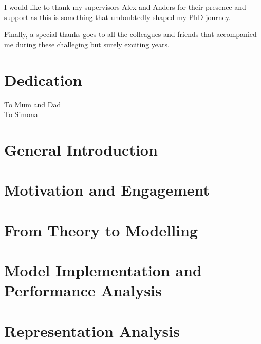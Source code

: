 \documentclass{yorkThesis}
\begin{document}
I would like to thank my supervisors Alex and Anders for their presence and support as this is something that undoubtedly shaped my PhD journey.

Finally, a special thanks goes to all  the colleagues and friends that accompanied me during these challeging but surely exciting years.


\chapter*{Dedication}
\label{dedication}

\begin{flushright}
To Mum and Dad\\
To Simona\\
\end{flushright}



\contents


\chapter*{General Introduction}
\label{chapter_general_intro}


\chapter{Motivation and Engagement}
\label{chapter_lit_review}


\chapter{From Theory to Modelling}
\label{chapter_theory_modelling}


\chapter{Model Implementation and Performance Analysis}
\label{chapter_implementation_testing}


\chapter{Representation Analysis}
\label{chapter_repr_anal}

\end{document}
